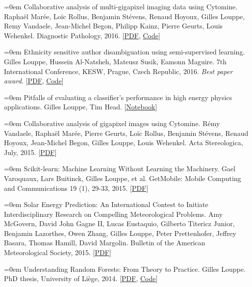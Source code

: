 \documentclass{scrartcl}
\newcommand{\MarginText}[1]{\marginpar{\raggedleft\itshape\small#1}}
\newcommand{\NewPublication}[4]{\noindent\hangindent=0em\hangafter=0 \MarginText{\color{black} #1}{\footnotesize [{\color{Maroon}#2}]} #3 {\footnotesize\color{gray}#4}\vspace{0.5em}}
\begin{document}
\begin{cv}{}
\NewPublication{}{16}{Collaborative analysis of multi-gigapixel imaging data using Cytomine.}{%
Rapha\"el Mar\'ee, Lo\"ic Rollus, Benjamin St\'evens, Renaud Hoyoux, Gilles Louppe, Remy Vandaele, Jean-Michel Begon, Philipp Kainz, Pierre Geurts, Louis Wehenkel.
Diagnostic Pathology, 2016.
[\href{http://bioinformatics.oxfordjournals.org/content/early/2016/01/09/bioinformatics.btw013.full.pdf+html}{PDF}, \href{http://www.cytomine.be/}{Code}]}

\NewPublication{}{15}{Ethnicity sensitive author disambiguation using semi-supervised learning.}{%
Gilles Louppe, Hussein Al-Natsheh, Mateusz Susik, Eamonn Maguire.
7th International Conference, KESW, Prague, Czech Republic, 2016. {\it Best paper award}.
[\href{http://arxiv.org/abs/1508.07744}{PDF}, \href{https://github.com/glouppe/paper-author-disambiguation/}{Code}]}

\NewPublication{2015}{14}{Pitfalls of evaluating a classifier’s performance in high energy physics applications.}{%
Gilles Louppe, Tim Head.
[\href{http://dx.doi.org/10.5281/zenodo.34934}{Notebook}]}

\NewPublication{}{13}{Collaborative analysis of gigapixel images using Cytomine.}{%
R\'emy Vandaele, Rapha\"el Mar\'ee, Pierre Geurts, Lo\"ic Rollus, Benjamin St\'evens, Renaud Hoyoux, Jean-Michel Begon, Gilles Louppe, Louis Wehenkel.
Acta Stereologica, July, 2015.
[\href{http://popups.ulg.ac.be/0351-580X/index.php?id=3692&file=1&pid=3681}{PDF}]}

\NewPublication{}{12}{Scikit-learn: Machine Learning Without Learning the Machinery.}{%
Gael Varoquaux, Lars Buitinck, Gilles Louppe, et al.
GetMobile: Mobile Computing and Communications 19 (1), 29-33, 2015.
[\href{https://dl.acm.org/citation.cfm?id=2786995}{PDF}]}

\NewPublication{}{11}{Solar Energy Prediction: An International Contest to Initiate Interdisciplinary Research on Compelling Meteorological Problems.}{%
Amy McGovern, David John Gagne II, Lucas Eustaquio, Gilberto Titericz Junior, Benjamin Lazorthes, Owen Zhang, Gilles Louppe, Peter Prettenhofer, Jeffrey Basara, Thomas Hamill, David Margolin.
Bulletin of the American Meteorological Society, 2015.
[\href{http://hdl.handle.net/2268/177115}{PDF}]}

\NewPublication{2014}{10}{Understanding Random Forests: From Theory to Practice.}{%
Gilles Louppe.
PhD thesis, University of Li{\`e}ge, 2014.
[\href{http://hdl.handle.net/2268/170309}{PDF}, \href{https://github.com/glouppe/phd-thesis}{Code}]}


\end{cv}
\end{document}
